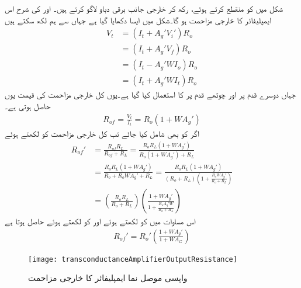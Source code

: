 شکل  میں  کو منقطع کرتے ہوئے،  رکھ  کر خارجی جانب برقی دباو  لاگو کرتے ہیں۔ اور  کی شرح اس ایمپلیفائر کا خارجی مزاحمت  ہو گا۔شکل  میں ایسا دکھایا گیا ہے جہاں سے ہم لکھ سکتے ہیں
\begin{align*}
V_t &=\left (I_t+A_g' V_i' \right) R_o \\
&=\left (I_t+A_g' V_f \right) R_o \\
&=\left (I_t- A_g' W I_o \right) R_o \\
&=\left (I_t+ A_g' W I_t \right) R_o
\end{align*}
جہاں دوسرے قدم پر  اور چوتھے قدم پر  کا استعمال کیا گیا ہے۔یوں کل خارجی مزاحمت   کی قیمت یوں حاصل ہوتی ہے۔
\begin{align}
R_{of}=\frac{V_t}{I_t}=R_o \left (1+W A_g' \right )
\end{align}
اگر  کو بھی شامل کیا جائے تب کل خارجی مزاحمت کو  لکھتے ہوئے
\begin{align*}
R_{of}' &=\frac{R_{of} R_L}{R_{of}+R_L}=\frac{R_o R_L \left (1+W A_g' \right )}{R_o \left (1+W A_g' \right )+R_L}\\
&=\frac{R_o R_L \left (1+W A_g' \right )}{R_o +R_o W A_g' +R_L}=\frac{R_o R_L \left (1+W A_g' \right )}{ \left (R_o+R_L \right )\left(1+\frac{R_o W A_g'}{R_o+R_L} \right)} \\
&=\left (\frac{R_o R_L}{R_o+R_L} \right ) \left ( \frac{1+W A_g'}{1+\frac{R_o  A_g' W}{R_o+R_L}}\right )
\end{align*}
اس مساوات میں  کو  لکھتے ہوئے اور  کو  لکھتے ہوئے حاصل ہوتا ہے
\begin{align}
R_{of}'=R_o'  \left (\frac{1+W A_g'}{1+W A_G}\right )
\end{align}
%
\begin{figure}
\centering
\texttt{[image: transconductanceAmplifierOutputResistance]}
\caption{واپسی موصل نما ایمپلیفائر کا خارجی مزاحمت}
\label{شکل_واپسی_موصلیت_نما_ایمپلیفائر_خارجی_مزاحمت}
\end{figure}

